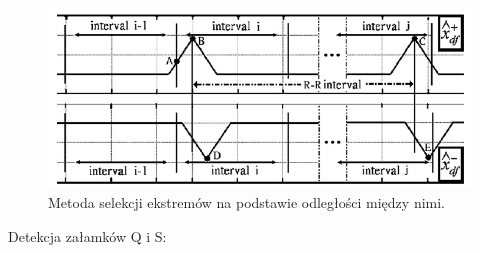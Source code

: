 \documentclass[10pt,a4paper]{article}
\begin{document}
\begin{figure}
  	\centering
    \includegraphics[width=1\textwidth]{dom6}
    \caption{Metoda selekcji ekstremów na podstawie odległości między nimi.}
 	 \label{fig:dom6}
\end{figure}
	
Detekcja załamków Q i S:
	
\end{document}
